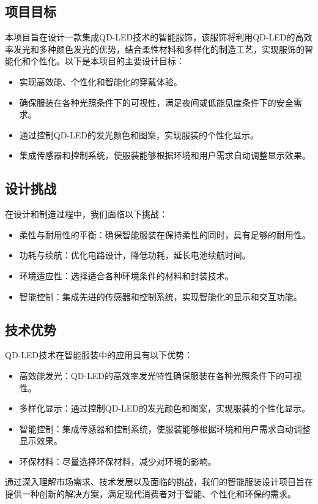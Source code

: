 \documentclass[12pt,hyperref,a4paper,UTF8]{ctexart}
\begin{document}
\subsection*{项目目标}
本项目旨在设计一款集成QD-LED技术的智能服饰，该服饰将利用QD-LED的高效率发光和多种颜色发光的优势，结合柔性材料和多样化的制造工艺，实现服饰的智能化和个性化。以下是本项目的主要设计目标：
\begin{itemize}
  \item 实现高效能、个性化和智能化的穿戴体验。
  \item 确保服装在各种光照条件下的可视性，满足夜间或低能见度条件下的安全需求。
  \item 通过控制QD-LED的发光颜色和图案，实现服装的个性化显示。
  \item 集成传感器和控制系统，使服装能够根据环境和用户需求自动调整显示效果。
\end{itemize}

\subsection*{设计挑战}
在设计和制造过程中，我们面临以下挑战：
\begin{itemize}
  \item 柔性与耐用性的平衡：确保智能服装在保持柔性的同时，具有足够的耐用性。
  \item 功耗与续航：优化电路设计，降低功耗，延长电池续航时间。
  \item 环境适应性：选择适合各种环境条件的材料和封装技术。
  \item 智能控制：集成先进的传感器和控制系统，实现智能化的显示和交互功能。
\end{itemize}

\subsection*{技术优势}
QD-LED技术在智能服装中的应用具有以下优势：
\begin{itemize}
  \item 高效能发光：QD-LED的高效率发光特性确保服装在各种光照条件下的可视性。
  \item 多样化显示：通过控制QD-LED的发光颜色和图案，实现服装的个性化显示。
  \item 智能控制：集成传感器和控制系统，使服装能够根据环境和用户需求自动调整显示效果。
  \item 环保材料：尽量选择环保材料，减少对环境的影响。
\end{itemize}

通过深入理解市场需求、技术发展以及面临的挑战，我们的智能服装设计项目旨在提供一种创新的解决方案，满足现代消费者对于智能、个性化和环保的需求。
\end{document}

